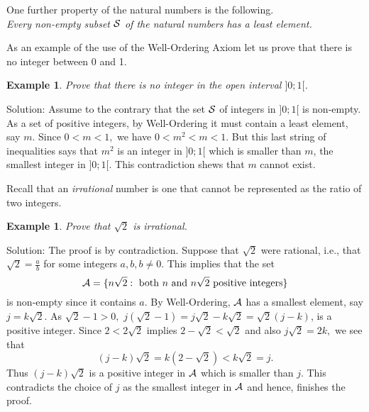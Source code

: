 \documentclass[11pt, openany]{book}
\theoremstyle{change} \theoremheaderfont{\blue\sffamily\bfseries}
\newtheorem{exa}[thm]{Example}
\theoremstyle{nonumberplain} \theoremheaderfont{\sffamily\bfseries}
\newcommand{\í}{\'{\i}}
\begin{document}
One further property of the natural numbers is the following.\\

 {\em Every non-empty subset
${\cal S}$ of the natural numbers has a least element.}

As an example of the use of the Well-Ordering Axiom let us prove
that there is no integer between 0 and 1.

\begin{exa}
Prove that there is no integer in the open interval $]0; 1[$.
\end{exa}
Solution: Assume to the contrary that the set $\cal{S}$ of
integers in $]0; 1[$ is non-empty. As a set of positive integers,
by Well-Ordering it must contain a least element, say $m$. Since
$0 < m < 1,$ we have $0 < m^2 < m < 1.$ But this last string of
inequalities says that $m^2$ is an integer in $]0; 1[$ which is
smaller than $m$, the smallest integer in $]0; 1[$. This
contradiction shews that $m$ cannot exist.



Recall that an {\em irrational} number is one that cannot be
represented as the ratio of two integers.

\begin{exa}
Prove that $\sqrt{2}$ is irrational.
\end{exa}
Solution: The proof is by contradiction. Suppose that $\sqrt{2}$
were rational, i.e., that $\sqrt{2} = \frac{a}{b}$ for some
integers $a, b, b \neq 0.$ This implies that the set
$${\cal A} = \{ n\sqrt{2}: \ {\rm both} \ n \ {\rm and} \ n\sqrt{2} \ {\rm positive} \ {\rm integers}\}$$
is non-empty since it contains $a.$ By Well-Ordering, ${\cal A}$
has a smallest element, say $j = k\sqrt{2}$. As $\sqrt{2} - 1 >
0,$ $j(\sqrt{2} - 1) = j\sqrt{2} - k\sqrt{2} = \sqrt{2}(j - k)$,
is a positive integer. Since $2 < 2\sqrt{2}$ implies $2 - \sqrt{2}
< \sqrt{2}$ and also $j\sqrt{2} = 2k,$ we see that
$$(j - k)\sqrt{2} = k(2 - \sqrt{2}) < k\sqrt{2} = j.$$Thus $(j - k)\sqrt{2}$ is a positive integer
in ${\cal A}$ which is smaller than $j$. This contradicts the
choice of $j$ as the smallest integer in ${\cal A}$ and hence,
finishes the proof.
\end{document}
